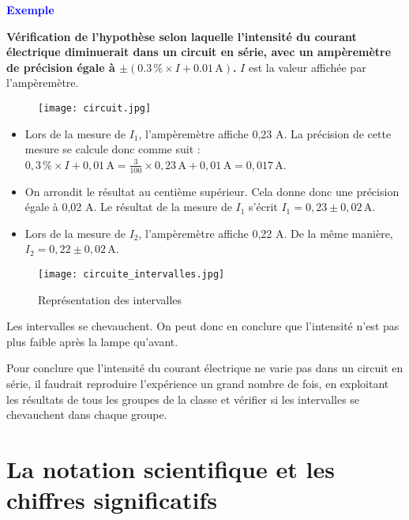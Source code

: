 \documentclass[a4paper,12pt]{article}
\begin{document}
\textcolor{blue}{\textbf{Exemple}}

\vspace{1em}

\textbf{Vérification de l’hypothèse selon laquelle l’intensité du courant électrique diminuerait dans un circuit en série, avec un ampèremètre de précision égale à $\pm (0.3 \, \% \times I + 0.01 \, \text{A})$.} $I$ est la valeur affichée par l’ampèremètre.

\begin{figure}[H]
  \centering
  \texttt{[image: circuit.jpg]}
\end{figure}

\begin{itemize}[noitemsep]
    \item Lors de la mesure de $I_1$, l’ampèremètre affiche 0,23 A.
    La précision de cette mesure se calcule donc comme suit :
    $0,3 \, \% \times I + 0,01 \, \text{A} = \frac{3}{100} \times 0,23 \, \text{A} + 0,01 \, \text{A} = 0,017 \, \text{A}$.
    
    \item On arrondit le résultat au centième supérieur.
    Cela donne donc une précision égale à 0,02 A.
    Le résultat de la mesure de $I_1$ s’écrit \textbf{$I_1 = 0,23 \pm 0,02 \, \text{A}$}.
    
    \item Lors de la mesure de $I_2$, l’ampèremètre affiche 0,22 A.
    De la même manière, \textbf{$I_2 = 0,22 \pm 0,02 \, \text{A}$}.
\end{itemize}


\begin{figure}[H]
  \centering
  \texttt{[image: circuite\_intervalles.jpg]}
  \caption{Représentation des intervalles}
\end{figure}

Les intervalles se chevauchent. On peut donc en conclure que l’intensité n’est pas plus faible après la lampe qu’avant.

\vspace{1em}

Pour conclure que l’intensité du courant électrique ne varie pas dans un circuit en série, il faudrait reproduire l’expérience un grand nombre de fois, en exploitant les résultats de tous les groupes de la classe et vérifier si les intervalles se chevauchent dans chaque groupe.


\section{La notation scientifique et les chiffres significatifs}
\end{document}
